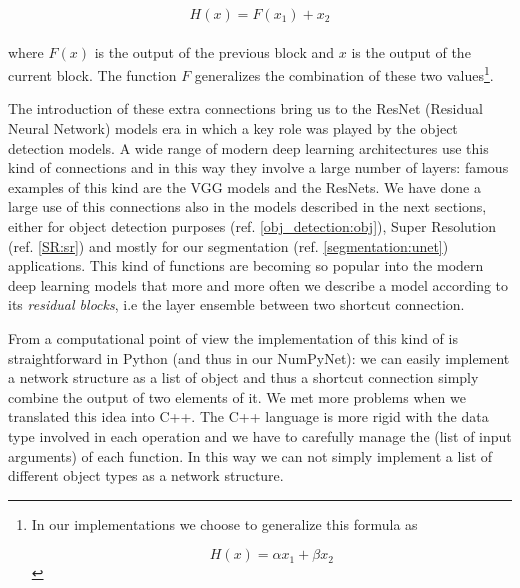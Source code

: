 \documentclass{standalone}
\begin{document}
$$
H(x) = F(x_1) + x_2
$$
\\
where $F(x)$ is the output of the previous block and $x$ is the output of the current block.
The function $F$ generalizes the combination of these two values\footnote{
  In our implementations we choose to generalize this formula as

  $$
  H(x) = \alpha x_1 + \beta x_2
  $$
}.

The introduction of these extra connections bring us to the ResNet (Residual Neural Network) models era in which a key role was played by the object detection models.
A wide range of modern deep learning architectures use this kind of connections and in this way they involve a large number of layers: famous examples of this kind are the VGG models and the ResNets.
We have done a large use of this connections also in the models described in the next sections, either for object detection purposes (ref. \ref{obj_detection:obj}), Super Resolution (ref. \ref{SR:sr}) and mostly for our segmentation (ref. \ref{segmentation:unet}) applications.
This kind of functions are becoming so popular into the modern deep learning models that more and more often we describe a model according to its \emph{residual blocks}, i.e the layer ensemble between two shortcut connection.

From a computational point of view the implementation of this kind of  is straightforward in Python (and thus in our NumPyNet): we can easily implement a network structure as a list of object and thus a shortcut connection simply combine the output of two elements of it.
We met more problems when we translated this idea into C++.
The C++ language is more rigid with the data type involved in each operation and we have to carefully manage the  (list of input arguments) of each function.
In this way we can not simply implement a list of different object types as a network structure.
\end{document}
